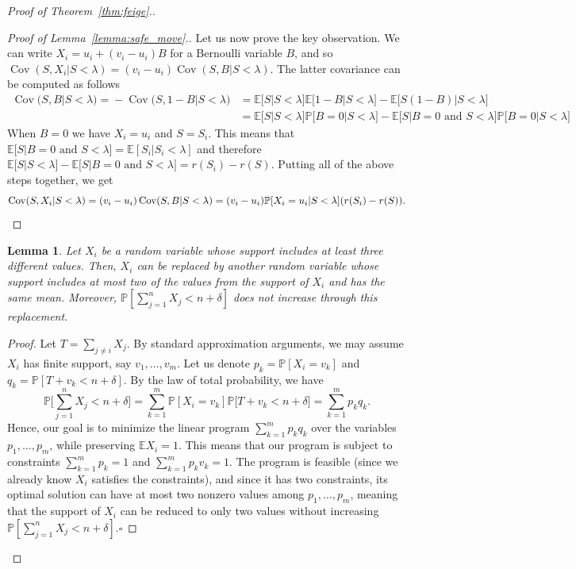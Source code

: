 \documentclass[10pt]{article}
\newtheorem{lemma}{Lemma}
\newcommand{\bE}{\mathbb{E}}
\newcommand{\Pb}{\mathbb P}
\newcommand{\Cov}{\operatorname{Cov}}
\begin{document}
\begin{proof}[Proof of Theorem~\ref{thm:feige}.]
\begin{proof}[Proof of Lemma~\ref{lemma:safe_move}.]
Let us now prove the key observation. We can write $X_i=u_i+(v_i-u_i)B$ for a Bernoulli variable $B$, and so $\Cov(S, X_i|S<\lambda)=(v_i-u_i)\Cov(S, B|S<\lambda)$. The latter covariance can be computed as follows
\vspace{-0.1cm}
\begin{align*}
\Cov\!\big(S, B\big|S<\lambda\big)\!=\!-\!\Cov\!\big(S, 1\!-\!B\big| S\!<\!\lambda\big)\!&=\!\bE\big[S\big|S\!<\!\lambda\big]\bE\big[1\!-\!B\big|S\!<\!\lambda\big]\!-\!\bE\big[S(1-B)\big|S<\lambda\big]\\
&=\!\bE\big[S\big|S\!<\!\lambda\big]\Pb\big[B\!=\!0\big|S\!<\!\lambda\big]\!-\!\bE\big[S\big|B\!=\!0\text{ and }S\!<\!\lambda\big]\Pb\big[B\!=\!0\big|S\!<\!\lambda\big]
\end{align*}
When $B=0$ we have $X_i=u_i$ and $S=S_i$. This means that 
$\bE\big[S\big|B\!=\!0\text{ and }S\!<\!\lambda\big]=\bE[S_i|S_i<\lambda]$ and therefore
$\bE\big[S\big|S\!<\!\lambda\big]\!-\!\bE\big[S\big|B\!=\!0\text{ and }S\!<\!\lambda\big]=r(S_i)-r(S)$.
Putting all of the above steps together, we get \[\Cov(S, X_i|S<\lambda)=(v_i-u_i)\Cov(S, B|S<\lambda)= (v_i-u_i)\Pb[X_i=u_i|S<\lambda](r(S_i)-r(S)).\qedhere\]
\end{proof}
\begin{lemma}\label{lemma:two_values}
Let $X_i$ be a random variable whose support includes at least three different values. Then, $X_i$ can be replaced by another random variable whose support includes at most two of the values from the support of $X_i$ and has the same mean. Moreover, $\Pb[\sum_{j=1}^n X_j<n+\delta]$ does not increase through this replacement.
\end{lemma}
\begin{proof}
Let $T=\sum_{j\ne i}X_j$. By standard approximation arguments, we may assume $X_i$ has finite support, say $v_1, \dots, v_m$. Let us denote $p_k=\Pb[X_i=v_k]$ and $q_k=\Pb[T+v_k<n+\delta]$. By the law of total probability, we have 
\[\Pb\Big[\sum_{j=1}^n X_j<n+\delta\Big]=\sum_{k=1}^m \Pb[X_i=v_k]\Pb\big[T+v_k<n+\delta\big]=\sum_{k=1}^m p_kq_k.\]
Hence, our goal is to minimize the linear program $\sum_{k=1}^m p_kq_k$ over the variables $p_1, \dots, p_m$, while preserving $\bE X_i=1$. This means that our program is subject to constraints $\sum_{k=1}^m p_k=1$ and $\sum_{k=1}^m p_kv_k=1$. The program is feasible (since we already know $X_i$ satisfies the constraints), and since it has two constraints, its optimal solution can have at most two nonzero values among $p_1, \dots, p_m$, meaning that the support of $X_i$ can be reduced to only two values without increasing $\Pb[\sum_{j=1}^n X_j<n+\delta]$.\hspace{5cm}$\square$
\end{proof}
\renewcommand{\qedsymbol}{}
\end{proof}
\vspace{-1.2cm}
\end{document}
